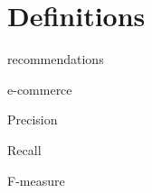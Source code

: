 \chapter{Definitions}\label{cha:definitions}

recommendations

e-commerce

Precision

Recall

F-measure


